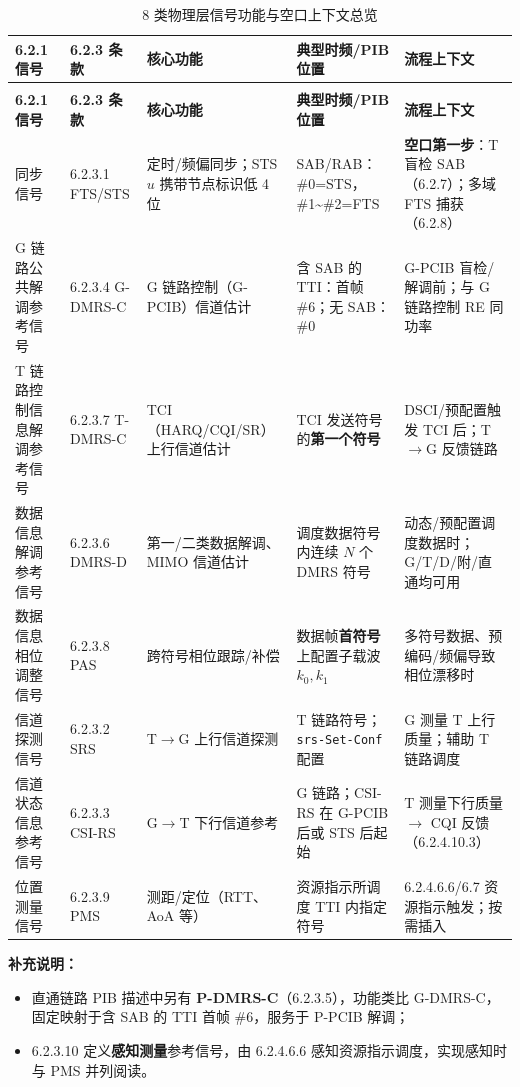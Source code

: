 \documentclass[11pt,a4paper]{ctexart}
\begin{document}
\begin{longtable}{@{}>{\small}L{2.4cm}>{\small}L{2cm}>{\small}L{3.2cm}>{\small}L{3.8cm}>{\small}L{3.2cm}@{}}
\caption{8 类物理层信号功能与空口上下文总览} \\
\toprule
\textbf{6.2.1 信号} & \textbf{6.2.3 条款} & \textbf{核心功能} & \textbf{典型时频/PIB 位置} & \textbf{流程上下文} \\
\midrule
\endfirsthead
{} \\
\toprule
\textbf{6.2.1 信号} & \textbf{6.2.3 条款} & \textbf{核心功能} & \textbf{典型时频/PIB 位置} & \textbf{流程上下文} \\
\midrule
\endhead
\bottomrule
\endfoot
同步信号 &
6.2.3.1 FTS/STS &
定时/频偏同步；STS $u$ 携带节点标识低 4 位 &
SAB/RAB：\#0=STS，\#1\textasciitilde\#2=FTS &
\textbf{空口第一步}：T 盲检 SAB（6.2.7）；多域 FTS 捕获（6.2.8） \\
G 链路公共解调参考信号 &
6.2.3.4 G-DMRS-C &
G 链路控制（G-PCIB）信道估计 &
含 SAB 的 TTI：首帧 \#6；无 SAB：\#0 &
G-PCIB 盲检/解调前；与 G 链路控制 RE 同功率 \\
T 链路控制信息解调参考信号 &
6.2.3.7 T-DMRS-C &
TCI（HARQ/CQI/SR）上行信道估计 &
TCI 发送符号的\textbf{第一个符号} &
DSCI/预配置触发 TCI 后；T$\rightarrow$G 反馈链路 \\
数据信息解调参考信号 &
6.2.3.6 DMRS-D &
第一/二类数据解调、MIMO 信道估计 &
调度数据符号内连续 $N$ 个 DMRS 符号 &
动态/预配置调度数据时；G/T/D/附/直通均可用 \\
数据信息相位调整信号 &
6.2.3.8 PAS &
跨符号相位跟踪/补偿 &
数据帧\textbf{首符号}上配置子载波 $k_0,k_1$ &
多符号数据、预编码/频偏导致相位漂移时 \\
信道探测信号 &
6.2.3.2 SRS &
T$\rightarrow$G 上行信道探测 &
T 链路符号；\texttt{srs-Set-Conf} 配置 &
G 测量 T 上行质量；辅助 T 链路调度 \\
信道状态信息参考信号 &
6.2.3.3 CSI-RS &
G$\rightarrow$T 下行信道参考 &
G 链路；CSI-RS 在 G-PCIB 后或 STS 后起始 &
T 测量下行质量 $\rightarrow$ CQI 反馈（6.2.4.10.3） \\
位置测量信号 &
6.2.3.9 PMS &
测距/定位（RTT、AoA 等） &
资源指示所调度 TTI 内指定符号 &
6.2.4.6.6/6.7 资源指示触发；按需插入 \\
\end{longtable}

\textbf{补充说明：}
\begin{itemize}[nosep]
  \item 直通链路 PIB 描述中另有 \textbf{P-DMRS-C}（6.2.3.5），功能类比 G-DMRS-C，固定映射于含 SAB 的 TTI 首帧 \#6，服务于 P-PCIB 解调；
  \item 6.2.3.10 定义\textbf{感知测量}参考信号，由 6.2.4.6.6 感知资源指示调度，实现感知时与 PMS 并列阅读。
\end{itemize}
\end{document}
